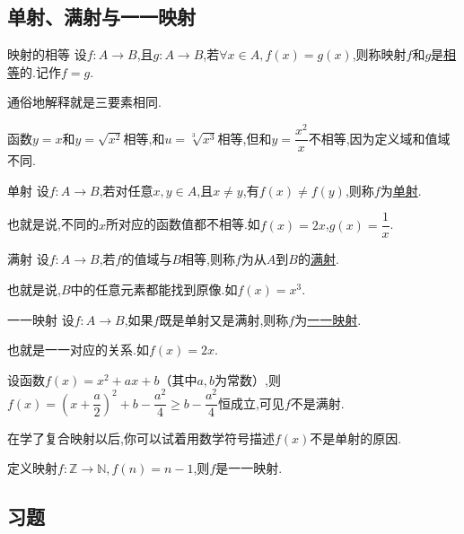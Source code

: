 \documentclass[lang=cn,math=cm,chinesefont=nofont,11pt,scheme=chinese,twocol]{elegantbook}
\begin{document}
\subsection{单射、满射与一一映射}

\begin{definition}{映射的相等}
  设$f:A\rightarrow B$,且$g:A\rightarrow B$,若$\forall x\in A,f(x)=g(x)$,则称映射$f$和$g$是\underline{相等}的.记作$f=g$.
\end{definition}

通俗地解释就是三要素相同.

\begin{example}
  函数$y=x$和$y=\sqrt{x^2}$相等,和$u=\sqrt[3]{x^3}$相等,但和$y=\dfrac{x^2}{x}$不相等,因为定义域和值域不同.
\end{example}

\begin{definition}{单射}
  设$f:A\rightarrow B$,若对任意$x,y\in A$,且$x\neq y$,有$f(x)\neq f(y)$,则称$f$为\underline{单射}.
\end{definition}

也就是说,不同的$x$所对应的函数值都不相等.如$f(x)=2x$,$g(x)=\dfrac{1}{x}$.

\begin{definition}{满射}
  设$f:A\rightarrow B$,若$f$的值域与$B$相等,则称$f$为从$A$到$B$的\underline{满射}.
\end{definition}

也就是说,$B$中的任意元素都能找到原像.如$f(x)=x^3$.

\begin{definition}{一一映射}
  设$f:A\rightarrow B$,如果$f$既是单射又是满射,则称$f$为\underline{一一映射}.
\end{definition}

也就是一一对应的关系.如$f(x)=2x$.

\begin{example}
  设函数$f(x)=x^2+ax+b$（其中$a,b$为常数）,则$f(x)=(x+\dfrac{a}{2})^2+b-\dfrac{a^2}{4}\geqslant b-\dfrac{a^2}{4}$恒成立,可见$f$不是满射.

  在学了复合映射以后,你可以试着用数学符号描述$f(x)$不是单射的原因.
\end{example}

\begin{example}
  定义映射$f:\mathbb{Z}\rightarrow\mathbb{N},f(n)=n-1$,则$f$是一一映射.
\end{example}

\subsection{习题}
\end{document}
